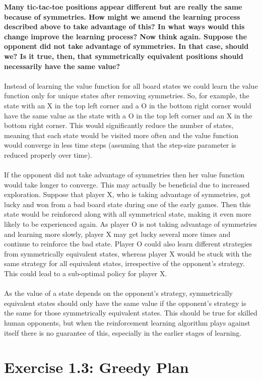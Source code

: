 \documentclass[a4paper,11pt]{article}
\numberwithin{equation}{section}
\theoremstyle{remark}
\begin{document}
\textbf{Many tic-tac-toe positions appear different but are really the same because of symmetries. How might we amend the learning process described above to take advantage of this? In what ways would this change improve the learning process? Now think again. Suppose the opponent did not take advantage of symmetries. In that case, should we? Is it true, then, that symmetrically equivalent positions should necessarily have the same value?}
\\ \\
Instead of learning the value function for all board states we could learn the value function only for unique states after removing symmetries. So, for example, the state with an X in the top left corner and a O in the bottom right corner would have the same value as the state with a O in the top left corner and an X in the bottom right corner. This would significantly reduce the number of states, meaning that each state would be visited more often and the value function would converge in less time steps (assuming that the step-size parameter is reduced properly over time).  
\\ \\
If the opponent did not take advantage of symmetries then her value function would take longer to converge. This may actually be beneficial due to increased exploration. Suppose that player X, who is taking advantage of symmetries, got lucky and won from a bad board state during one of the early games. Then this state would be reinforced along with all symmetrical state, making it even more likely to be experienced again. As player O is not taking advantage of symmetries and learning more slowly, player X may get lucky several more times and continue to reinforce the bad state. Player O could also learn different strategies from symmetrically equivalent states, whereas player X would be stuck with the same strategy for all equivalent states, irrespective of the opponent's strategy. This could lead to a sub-optimal policy for player X. 
\\ \\
As the value of a state depends on the opponent's strategy, symmetrically equivalent states should only have the same value if the opponent's strategy is the same for those symmetrically equivalent states. This should be true for skilled human opponents, but when the reinforcement learning algorithm plays against itself there is no guarantee of this, especially in the earlier stages of learning.  
 

\section{Exercise 1.3: Greedy Plan}
\end{document}
